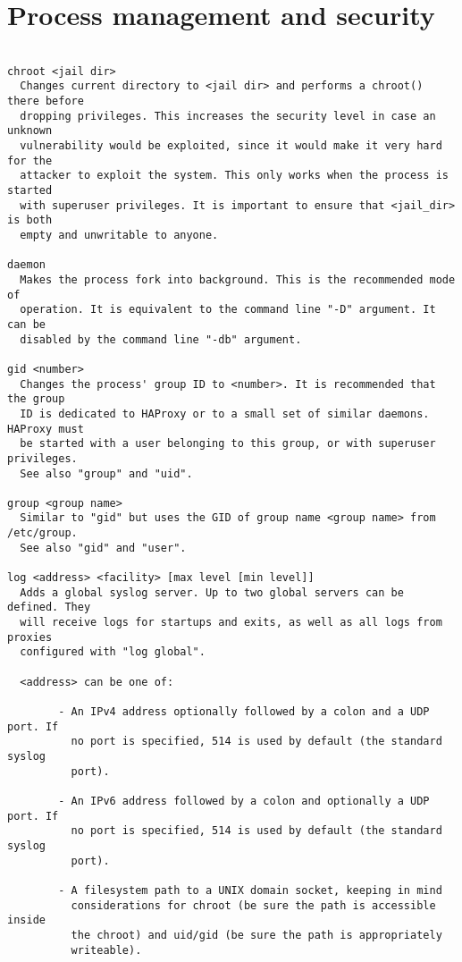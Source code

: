 
\section{Process management and security}

\begin{verbatim}

chroot <jail dir>
  Changes current directory to <jail dir> and performs a chroot() there before
  dropping privileges. This increases the security level in case an unknown
  vulnerability would be exploited, since it would make it very hard for the
  attacker to exploit the system. This only works when the process is started
  with superuser privileges. It is important to ensure that <jail_dir> is both
  empty and unwritable to anyone.

daemon
  Makes the process fork into background. This is the recommended mode of
  operation. It is equivalent to the command line "-D" argument. It can be
  disabled by the command line "-db" argument.

gid <number>
  Changes the process' group ID to <number>. It is recommended that the group
  ID is dedicated to HAProxy or to a small set of similar daemons. HAProxy must
  be started with a user belonging to this group, or with superuser privileges.
  See also "group" and "uid".

group <group name>
  Similar to "gid" but uses the GID of group name <group name> from /etc/group.
  See also "gid" and "user".

log <address> <facility> [max level [min level]]
  Adds a global syslog server. Up to two global servers can be defined. They
  will receive logs for startups and exits, as well as all logs from proxies
  configured with "log global".

  <address> can be one of:

        - An IPv4 address optionally followed by a colon and a UDP port. If
          no port is specified, 514 is used by default (the standard syslog
          port).

        - An IPv6 address followed by a colon and optionally a UDP port. If
          no port is specified, 514 is used by default (the standard syslog
          port).

        - A filesystem path to a UNIX domain socket, keeping in mind
          considerations for chroot (be sure the path is accessible inside
          the chroot) and uid/gid (be sure the path is appropriately
          writeable).


\end{verbatim}
